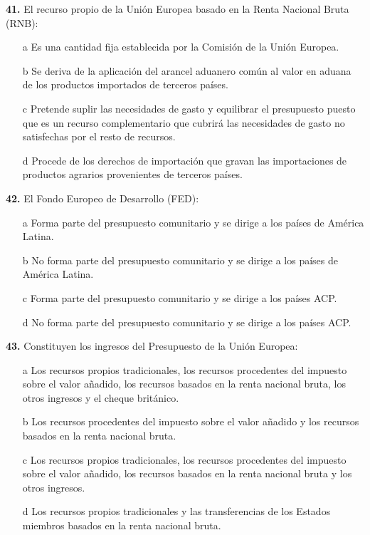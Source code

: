 \documentclass{nuevotema}
\begin{document}
\textbf{41.} El recurso propio de la Unión Europea basado en la Renta Nacional Bruta (RNB):
\begin{enumerate}
	\item[a] Es una cantidad fija establecida por la Comisión de la Unión Europea.
	\item[b] Se deriva de la aplicación del arancel aduanero común al valor en aduana de los productos importados de terceros países.
	\item[c] Pretende suplir las necesidades de gasto y equilibrar el presupuesto puesto que es un recurso complementario que cubrirá las necesidades de gasto no satisfechas por el resto de recursos.
	\item[d] Procede de los derechos de importación que gravan las importaciones de productos agrarios provenientes de terceros países.
\end{enumerate}

\textbf{42.} El Fondo Europeo de Desarrollo (FED):
\begin{enumerate}
	\item[a] Forma parte del presupuesto comunitario y se dirige a los países de América Latina.
	\item[b] No forma parte del presupuesto comunitario y se dirige a los países de América Latina.
	\item[c] Forma parte del presupuesto comunitario y se dirige a los países ACP.
	\item[d] No forma parte del presupuesto comunitario y se dirige a los países ACP.
\end{enumerate}

\textbf{43.} Constituyen los ingresos del Presupuesto de la Unión Europea:
\begin{enumerate}
	\item[a] Los recursos propios tradicionales, los recursos procedentes del impuesto sobre el valor añadido, los recursos basados en la renta nacional bruta, los otros ingresos y el cheque británico.
	\item[b] Los recursos procedentes del impuesto sobre el valor añadido y los recursos basados en la renta nacional bruta.
	\item[c] Los recursos propios tradicionales, los recursos procedentes del impuesto sobre el valor añadido, los recursos basados en la renta nacional bruta y los otros ingresos.
	\item[d] Los recursos propios tradicionales y las transferencias de los Estados miembros basados en la renta nacional bruta.
\end{enumerate}
\end{document}
